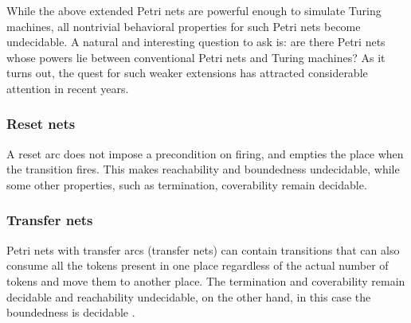 While the above extended Petri nets are powerful enough to simulate Turing machines, all nontrivial behavioral properties for such Petri nets become undecidable. A natural and interesting question to ask is: are there Petri nets whose powers lie between conventional Petri nets and Turing machines? As it turns out, the quest for such weaker extensions has attracted considerable attention in recent years.

\subsubsection{Reset nets} %
\label{ssub:reset_nets}

A reset arc does not impose a precondition on firing, and empties the place when the transition fires. This makes reachability and boundedness undecidable, while some other properties, such as termination, coverability remain decidable.


\subsubsection{Transfer nets} %
\label{ssub:transfer_nets}

Petri nets with transfer arcs (transfer nets) can contain transitions that can also consume all the tokens present in one place regardless of the actual number of tokens and move them to another place. The termination and coverability remain decidable and reachability undecidable, on the other hand, in this case the boundedness is decidable \cite{Dufourd98Reset}.


